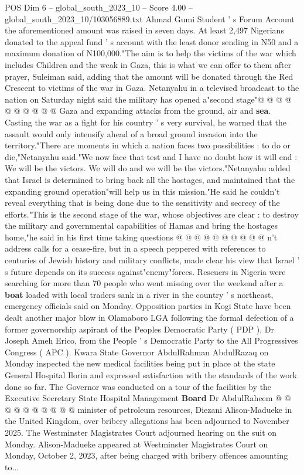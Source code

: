 \begin{textsample}{POS Dim 6 – global\_south\_2023\_10 – Score 4.00 – global\_south\_2023\_10/103056889.txt}
Ahmad Gumi Student ' s Forum Account the aforementioned amount was raised in seven days.
At least 2,497 Nigerians donated to the appeal fund ' s account with the least donor sending in N50 and a maximum donation of N100,000."The aim is to help the victims of the war which includes Children and the weak in Gaza, this is what we can offer to them after prayer, Suleiman said, adding that the amount will be donated through the Red Crescent to victims of the war in Gaza.
Netanyahu in a televised broadcast to the nation on Saturday night said the military has opened a"second stage"@ @ @ @ @ @ @ @ @ @ Gaza and expanding attacks from the ground, air and \textbf{sea}.
Casting the war as a fight for his country ' s very survival, he warned that the assault would only intensify ahead of a broad ground invasion into the territory."There are moments in which a nation faces two possibilities : to do or die,"Netanyahu said."We now face that test and I have no doubt how it will end : We will be the victors.
We will do and we will be the victors."Netanyahu added that Israel is determined to bring back all the hostages, and maintained that the expanding ground operation"will help us in this mission."He said he couldn't reveal everything that is being done due to the sensitivity and secrecy of the efforts."This is the second stage of the war, whose objectives are clear : to destroy the military and governmental capabilities of Hamas and bring the hostages home,"he said in his first time taking questions @ @ @ @ @ @ @ @ @ @ n't address calls for a cease-fire, but in a speech peppered with references to centuries of Jewish history and military conflicts, made clear his view that Israel ' s future depends on its success against"enemy"forces.
Rescuers in Nigeria were searching for more than 70 people who went missing over the weekend after a \textbf{boat} loaded with local traders sank in a river in the country ' s northeast, emergency officials said on Monday.
Opposition parties in Kogi State have been dealt another major blow in Olamaboro LGA following the formal defection of a former governorship aspirant of the Peoples Democratic Party ( PDP ), Dr Joseph Ameh Erico, from the People ' s Democratic Party to the All Progressives Congress ( APC ).
Kwara State Governor AbdulRahman AbdulRazaq on Monday inspected the new medical facilities being put in place at the state General Hospital Ilorin and expressed satisfaction with the standards of the work done so far.
The Governor was conducted on a tour of the facilities by the Executive Secretary State Hospital Management \textbf{Board} Dr AbdulRaheem @ @ @ @ @ @ @ @ @ @ minister of petroleum resources, Diezani Alison-Madueke in the United Kingdom, over bribery allegations has been adjourned to November 2025.
The Westminster Magistrates Court adjourned hearing on the suit on Monday.
Alison-Madueke appeared at Westminster Magistrates Court on Monday, October 2, 2023, after being charged with bribery offences amounting to...

\end{textsample}
